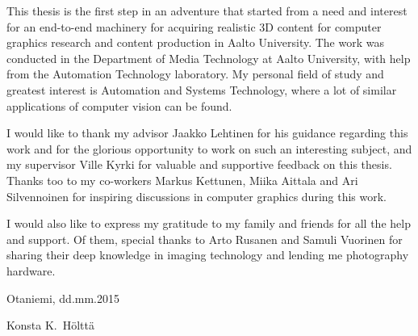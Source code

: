 This thesis is the first step in an adventure that started from a need and interest for an end-to-end machinery for acquiring realistic 3D content for computer graphics research and content production in Aalto University.
The work was conducted in the Department of Media Technology at Aalto University, with help from the Automation Technology laboratory.
My personal field of study and greatest interest is Automation and Systems Technology, where a lot of similar applications of computer vision can be found.

I would like to thank my advisor Jaakko Lehtinen for his guidance regarding this work and for the glorious opportunity to work on such an interesting subject, and my supervisor Ville Kyrki for valuable and supportive feedback on this thesis.
Thanks too to my co-workers Markus Kettunen, Miika Aittala and Ari Silvennoinen for inspiring discussions in computer graphics during this work.

I would also like to express my gratitude to my family and friends for all the help and support.
Of them, special thanks to Arto Rusanen and Samuli Vuorinen for sharing their deep knowledge in imaging technology and lending me photography hardware.


\vspace{5cm}
Otaniemi, dd.mm.2015

\vspace{5mm}
{\hfill Konsta K.\ Hölttä \hspace{1cm}}
